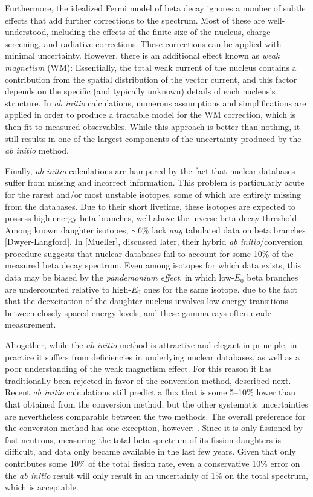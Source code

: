\documentclass[../thesis.tex]{subfiles}
\begin{document}
Furthermore, the idealized Fermi model of beta decay ignores a number of subtle effects that add further corrections to the spectrum. Most of these are well-understood, including the effects of the finite size of the nucleus, charge screening, and radiative corrections. These corrections can be applied with minimal uncertainty. However, there is an additional effect known as \emph{weak magnetism} (WM): Essentially, the total weak current of the nucleus contains a contribution from the spatial distribution of the vector current, and this factor depends on the specific (and typically unknown) details of each nucleus's structure. In \emph{ab initio} calculations, numerous assumptions and simplifications are applied in order to produce a tractable model for the WM correction, which is then fit to measured observables. While this approach is better than nothing, it still results in one of the largest components of the uncertainty produced by the \emph{ab initio} method.

Finally, \emph{ab initio} calculations are hampered by the fact that nuclear databases suffer from missing and incorrect information. This problem is particularly acute for the rarest and/or most unstable isotopes, some of which are entirely missing from the databases. Due to their short livetime, these isotopes are expected to possess high-energy beta branches, well above the inverse beta decay threshold. Among known daughter isotopes, $\sim$6\% lack \emph{any} tabulated data on beta branches [Dwyer-Langford]. In [Mueller], discussed later, their hybrid \emph{ab initio}/conversion procedure suggests that nuclear databases fail to account for some 10\% of the measured beta decay spectrum. Even among isotopes for which data exists, this data may be biased by the \emph{pandemonium effect}, in which low-$E_0$ beta branches are undercounted relative to high-$E_0$ ones for the same isotope, due to the fact that the deexcitation of the daughter nucleus involves low-energy transitions between closely spaced energy levels, and these gamma-rays often evade measurement.

Altogether, while the \emph{ab initio} method is attractive and elegant in principle, in practice it suffers from deficiencies in underlying nuclear databases, as well as a poor understanding of the weak magnetism effect. For this reason it has traditionally been rejected in favor of the conversion method, described next. Recent \emph{ab initio} calculations still predict a flux that is some 5--10\% lower than that obtained from the conversion method, but the other systematic uncertainties are nevertheless comparable between the two methods. The overall preference for the conversion method has one exception, however: \ureight. Since it is only fissioned by fast neutrons, measuring the total beta spectrum of its fission daughters is difficult, and data only became available in the last few years. Given that \ureight only contributes some 10\% of the total fission rate, even a conservative 10\% error on the \emph{ab initio} result will only result in an uncertainty of 1\% on the total spectrum, which is acceptable.
\end{document}
